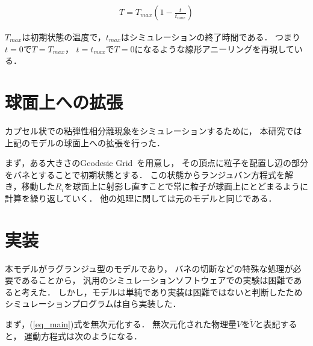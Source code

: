 \begin{eqnarray}
T = T_{max}(1-\frac{t}{t_{max}})
\end{eqnarray}

$T_{max}$は初期状態の温度で，$t_{max}$はシミュレーションの終了時間である．
つまり$t=0$で$T=T_{max}$，
$t=t_{max}$で$T=0$になるような線形アニーリングを再現している．


\section{球面上への拡張}
カプセル状での粘弾性相分離現象をシミュレーションするために，
本研究では上記のモデルの球面上への拡張を行った．

まず，ある大きさのGeodesic Grid~\cite{Geodesic}を用意し，
その頂点に粒子を配置し辺の部分をバネとすることで初期状態とする．
この状態からランジュバン方程式を解き，移動した$R_i$を球面上に射影し直すことで常に粒子が球面上にとどまるように計算を繰り返していく．
他の処理に関しては元のモデルと同じである．




\section{実装}
本モデルがラグランジュ型のモデルであり，
バネの切断などの特殊な処理が必要であることから，
汎用のシミュレーションソフトウェアでの実験は困難であると考えた．
しかし，モデルは単純であり実装は困難ではないと判断したためシミュレーションプログラムは自ら実装した．

まず，(\ref{eq_main})式を無次元化する．
無次元化された物理量$V$を$\tilde{V}$と表記すると，
運動方程式は次のようになる．
